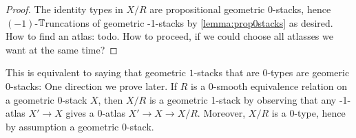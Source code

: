 \documentclass{article}
\newcommand{\truncation}{$\bT$runcation}
\begin{document}
\begin{proof}
The identity types in $X / R$ are propositional geometric 0-stacks, hence $(-1)$-\truncation s of geometric -1-stacks by \ref{lemma:prop0stacks} as desired. \\
How to find an atlas: todo. How to proceed, if we could choose all atlasses we want at the same time?

    
\end{proof}
\begin{rmk}
    This is equivalent to saying that geometric $1$-stacks that are $0$-types are geomeric $0$-stacks: One direction we prove later. If $R$ is a 0-smooth equivalence relation on a geometric 0-stack $X$, then $ X/ R$ is a geometric 1-stack by observing that any -1-atlas $X' \to X$ gives a 0-atlas $X' \to X \to X/ R$. Moreover, $ X/ R$ is a 0-type, hence by assumption a geometric 0-stack.
\end{rmk}
\end{document}
